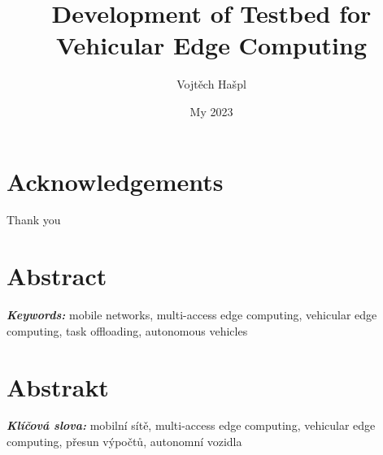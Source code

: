 \documentclass[12pt,a4paper,twoside]{report}
\title {Development of Testbed for Vehicular Edge Computing}
\author{Vojtěch Hašpl}
\date{My 2023}
\providecommand{\keywords}[1]{\vspace{4pt}\textbf{\textit{Keywords: }} #1}
\providecommand{\keywordscz}[1]{\vspace{4pt}\textbf{\textit{Klíčová slova: }} #1}
\begin{document}
\maketitle




\makestatement




\chapter*{Acknowledgements}
	Thank you


\chapter*{Abstract}
\keywords{mobile networks, multi-access edge computing, vehicular edge computing, task offloading, autonomous vehicles}
%
%
\newpage

\chapter*{Abstrakt}
\keywordscz{mobilní sítě, multi-access edge computing, vehicular edge computing, přesun výpočtů, autonomn\'i vozidla}
%
%
\newpage

\tableofcontents			

\glsaddallunused
\printglossary[type=\acronymtype,title={List of Abbreviations}]	%



\newpage

\setcounter{page}{1}
\end{document}
